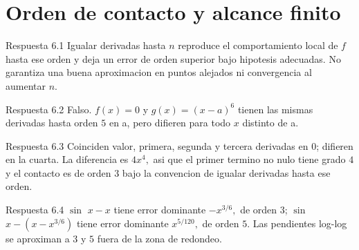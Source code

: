 \documentclass[10pt,a4paper,oneside,openany]{book}
\begin{document}
\section{Orden de contacto y alcance finito}
\begin{PSevenAnswerFixed}{Respuesta 6.1}
Igualar derivadas hasta \(n\) reproduce el comportamiento local de \(f\) hasta ese orden y deja un error de orden superior bajo hipotesis adecuadas. No garantiza una buena aproximacion en puntos alejados ni convergencia al aumentar \(n\).
\end{PSevenAnswerFixed}
\begin{PSevenAnswerFixed}{Respuesta 6.2}
Falso. \(f(x)=0\) y \(g(x)=(x-a)^{6}\) tienen las mismas derivadas hasta orden \(5\) en a, pero difieren para todo \(x\) distinto de a.
\end{PSevenAnswerFixed}
\begin{PSevenAnswerFixed}{Respuesta 6.3}
Coinciden valor, primera, segunda y tercera derivadas en \(0\); difieren en la cuarta. La diferencia es \(4x^{4},\) asi que el primer termino no nulo tiene grado \(4\) y el contacto es de orden \(3\) bajo la convencion de igualar derivadas hasta ese orden.
\end{PSevenAnswerFixed}
\begin{PSevenAnswerFixed}{Respuesta 6.4}
\(\sin\) \(x-x\) tiene error dominante \(-x^{3/6},\) de orden \(3\); \(\sin\) \(x-(x-x^{3/6})\) tiene error dominante \(x^{5/120},\) de orden \(5\). Las pendientes log-log se aproximan a \(3\) y \(5\) fuera de la zona de redondeo.
\end{PSevenAnswerFixed}
\end{document}
